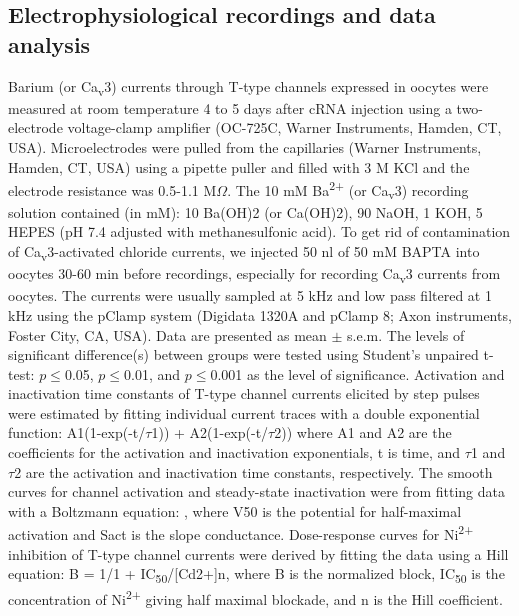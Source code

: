 \subsection*{Electrophysiological recordings and data analysis}

Barium (or Ca\textsubscript{v}3) currents through T-type channels expressed in oocytes were measured at room temperature 4 to 5 days after cRNA injection using a two-electrode voltage-clamp amplifier (OC-725C, Warner Instruments, Hamden, CT, USA).
Microelectrodes were pulled from the capillaries (Warner Instruments, Hamden, CT, USA) using a pipette puller and filled with 3 M KCl and the electrode resistance was 0.5-1.1 M$\Omega$.
The 10 mM Ba\textsuperscript{2+} (or Ca\textsubscript{v}3) recording solution contained (in mM): 10 Ba(OH)2 (or Ca(OH)2), 90 NaOH, 1 KOH, 5 HEPES (pH 7.4 adjusted with methanesulfonic acid).
To get rid of contamination of Ca\textsubscript{v}3-activated chloride currents, we injected 50 nl of 50 mM BAPTA into oocytes 30-60 min before recordings, especially for recording Ca\textsubscript{v}3 currents from oocytes.
The currents were usually sampled at 5 kHz and low pass filtered at 1 kHz using the pClamp system (Digidata 1320A and pClamp 8; Axon instruments, Foster City, CA, USA).
Data are presented as mean $\pm$ s.e.m.
The levels of significant difference(s) between groups were tested using Student's unpaired t-test: $p\le$0.05, $p\le$0.01, and $p\le$0.001 as the level of significance.
Activation and inactivation time constants of T-type channel currents elicited by step pulses were estimated by fitting individual current traces with a double exponential function: A1(1-exp(-t/$\tau$1)) + A2(1-exp(-t/$\tau$2)) where A1 and A2 are the coefficients for the activation and inactivation exponentials, t is time, and $\tau$1 and $\tau$2 are the activation and inactivation time constants, respectively.
The smooth curves for channel activation and steady-state inactivation were from fitting data with a Boltzmann equation: , where V50 is the potential for half-maximal activation and Sact is the slope conductance.
Dose-response curves for Ni\textsuperscript{2+} inhibition of T-type channel currents were derived by fitting the data using a Hill equation: B = 1/{1 + IC\textsubscript{50}/[Cd2+]n}, where B is the normalized block, IC\textsubscript{50} is the concentration of Ni\textsuperscript{2+} giving half maximal blockade, and n is the Hill coefficient.
    